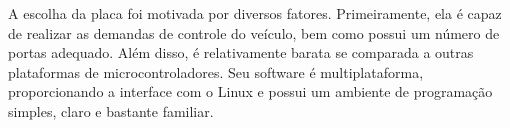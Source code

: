  A escolha da placa foi motivada por diversos fatores.
  Primeiramente, ela é capaz de realizar as demandas de controle do
  veículo, bem como possui um número de portas adequado. Além disso,
  é relativamente barata se comparada a outras plataformas de
  microcontroladores. Seu software é multiplataforma, proporcionando
  a interface com o Linux e possui um ambiente de programação simples,
  claro e bastante familiar.

